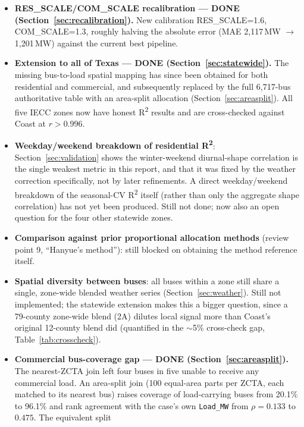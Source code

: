 \documentclass[11pt]{article}
\begin{document}
\begin{itemize}
    \item \textbf{RES\_SCALE/COM\_SCALE recalibration --- DONE (Section~\ref{sec:recalibration}).}
    New calibration RES\_SCALE=1.6, COM\_SCALE=1.3, roughly halving the absolute error
    (MAE 2{,}117\,MW $\rightarrow$ 1{,}201\,MW) against the current best pipeline.
    \item \textbf{Extension to all of Texas --- DONE (Section~\ref{sec:statewide}).}
    The missing bus-to-load spatial mapping has since been obtained for both residential
    and commercial, and subsequently replaced by the full 6{,}717-bus authoritative table
    with an area-split allocation (Section~\ref{sec:areasplit}). All five IECC
    zones now have honest R\textsuperscript{2} results and are cross-checked against
    Coast at $r>0.996$.
    \item \textbf{Weekday/weekend breakdown of residential R\textsuperscript{2}}:
    Section~\ref{sec:validation} shows the winter-weekend diurnal-shape correlation
    is the single weakest metric in this report, and that it was fixed by the weather
    correction specifically, not by later refinements. A direct weekday/weekend
    breakdown of the seasonal-CV R\textsuperscript{2} itself (rather than only the
    aggregate shape correlation) has not yet been produced. Still not done; now also
    an open question for the four other statewide zones.
    \item \textbf{Comparison against prior proportional allocation methods}
    (review point 9, ``Hanyue's method''): still blocked on obtaining the method
    reference itself.
    \item \textbf{Spatial diversity between buses}: all buses within a zone still
    share a single, zone-wide blended weather series (Section~\ref{sec:weather}).
    Still not implemented; the statewide extension makes this a bigger question, since
    a 79-county zone-wide blend (2A) dilutes local signal more than Coast's original
    12-county blend did (quantified in the $\sim$5\% cross-check gap,
    Table~\ref{tab:crosscheck}).
    \item \textbf{Commercial bus-coverage gap --- DONE (Section~\ref{sec:areasplit}).}
    The nearest-ZCTA join left four buses in five unable to receive any commercial load.
    An area-split join (100 equal-area parts per ZCTA, each matched to its nearest bus)
    raises coverage of load-carrying buses from 20.1\% to 96.1\% and rank agreement with
    the case's own \texttt{Load\_MW} from $\rho=0.133$ to $0.475$. The equivalent split

\end{itemize}
\end{document}
